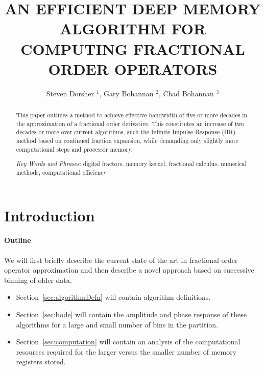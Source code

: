 \documentclass[twoside,reqno,11pt]{article}
\title{AN EFFICIENT DEEP MEMORY ALGORITHM FOR COMPUTING FRACTIONAL ORDER OPERATORS}
\author{Steven Dorsher $^1$, Gary Bohannan $^2$, Chad Bohannan $^3$}
\begin{document}
\maketitle

 \begin{abstract}

This paper outlines a method to achieve effective bandwidth of five or
more decades in the approximation of a fractional order
derivative. This constitutes an increase of two decades or more over
current algorithms, such the Infinite Impulse Response (IIR) method
based on continued fraction expansion, while demanding only slightly
more computational steps and processor memory.

 \medskip


 \smallskip

{\it Key Words and Phrases}: digital fractors, memory kernel,
fractional calculus, numerical methods, computational efficiency

\end{abstract}


 \vspace*{-16pt}


\section{Introduction}\label{sec:intro}
\setcounter{section}{1}
\setcounter{equation}{0}



\paragraph{Outline\\}
We will first briefly describe the current state of the art in
fractional order operator approximation and then describe a novel
approach based on successive binning of older data.

\begin{itemize} 
\item Section~\ref{sec:algorithmDefn} will contain algorithm definitions. 
\item Section~\ref{sec:bode} will contain the amplitude and phase response
  of these algorithms for a large and small number of bins in the
  partition.
\item Section~\ref{sec:computation} will contain an analysis of the
  computational resources required for the larger versus the smaller
  number of memory registers stored.
\end{itemize}
\end{document}
